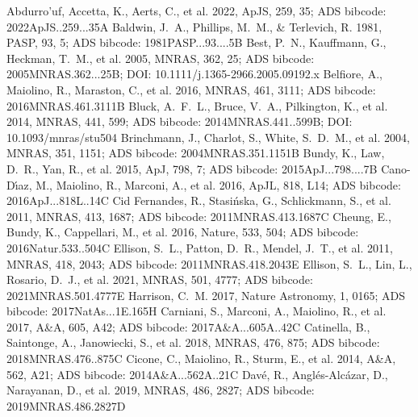 \documentclass[twocolumn]{aastex631}
\begin{document}
\begin{thebibliography}{}
 Abdurro'uf, Accetta, K., Aerts, C., et al. 2022, ApJS, 259, 35; ADS bibcode: 2022ApJS..259...35A
 Baldwin, J.~A., Phillips, M.~M., \& Terlevich, R. 1981, PASP, 93, 5; ADS bibcode: 1981PASP...93....5B
 Best, P.~N., Kauffmann, G., Heckman, T.~M., et al. 2005, MNRAS, 362, 25; ADS bibcode: 2005MNRAS.362...25B; DOI: 10.1111/j.1365-2966.2005.09192.x
 Belfiore, A., Maiolino, R., Maraston, C., et al. 2016, MNRAS, 461, 3111; ADS bibcode: 2016MNRAS.461.3111B
 Bluck, A.~F.~L., Bruce, V.~A., Pilkington, K., et al. 2014, MNRAS, 441, 599; ADS bibcode: 2014MNRAS.441..599B; DOI: 10.1093/mnras/stu504
 Brinchmann, J., Charlot, S., White, S.~D.~M., et al. 2004, MNRAS, 351, 1151; ADS bibcode: 2004MNRAS.351.1151B
 Bundy, K., Law, D.~R., Yan, R., et al. 2015, ApJ, 798, 7; ADS bibcode: 2015ApJ...798....7B
 Cano-D\'{\i}az, M., Maiolino, R., Marconi, A., et al. 2016, ApJL, 818, L14; ADS bibcode: 2016ApJ...818L..14C
 Cid Fernandes, R., Stasi{\'n}ska, G., Schlickmann, S., et al. 2011, MNRAS, 413, 1687; ADS bibcode: 2011MNRAS.413.1687C
 Cheung, E., Bundy, K., Cappellari, M., et al. 2016, Nature, 533, 504; ADS bibcode: 2016Natur.533..504C
 Ellison, S.~L., Patton, D.~R., Mendel, J.~T., et al. 2011, MNRAS, 418, 2043; ADS bibcode: 2011MNRAS.418.2043E
 Ellison, S.~L., Lin, L., Rosario, D.~J., et al. 2021, MNRAS, 501, 4777; ADS bibcode: 2021MNRAS.501.4777E
 Harrison, C.~M. 2017, Nature Astronomy, 1, 0165; ADS bibcode: 2017NatAs...1E.165H
 Carniani, S., Marconi, A., Maiolino, R., et al. 2017, A\&A, 605, A42; ADS bibcode: 2017A\&A...605A..42C
 Catinella, B., Saintonge, A., Janowiecki, S., et al. 2018, MNRAS, 476, 875; ADS bibcode: 2018MNRAS.476..875C
 Cicone, C., Maiolino, R., Sturm, E., et al. 2014, A\&A, 562, A21; ADS bibcode: 2014A\&A...562A..21C
 Dav{\'e}, R., Angl{\'e}s-Alc{\'a}zar, D., Narayanan, D., et al. 2019, MNRAS, 486, 2827; ADS bibcode: 2019MNRAS.486.2827D

\end{thebibliography}
\end{document}
